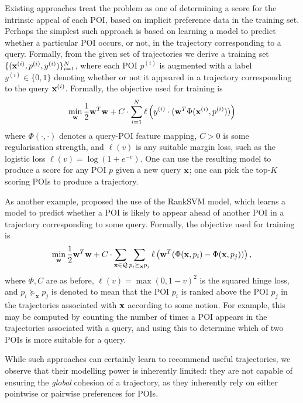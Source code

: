 
Existing approaches treat the problem as one of determining a score for the intrinsic appeal of each POI,
based on implicit preference data in the training set.
Perhaps the simplest such approach is based on learning a model to predict whether a particular POI occurs, or not, in the trajectory corresponding to a query.
Formally, from the given set of trajectories
we derive a training set $\{ ( \mathbf{x}^{(i)}, p^{(i)}, y^{(i)} ) \}_{i = 1}^N$,
where each POI $p^{(i)}$ is augmented with a label $y^{(i)} \in \{ 0, 1 \}$ denoting whether or not it appeared in a trajectory corresponding to the query $\mathbf{x}^{(i)}$. 
Formally, the objective used for training is
$$ \min_{\mathbf{w}} \frac{1}{2} \mathbf{w}^T \mathbf{w} + C \cdot \sum_{i = 1}^N \ell\left( y^{(i)} \cdot ( \mathbf{w}^T \Phi( \mathbf{x}^{(i)}, p^{(i)} ) ) \right) $$
where
$\Phi( \cdot, \cdot )$ denotes a query-POI feature mapping,
$C > 0$ is some regularisation strength,
and $\ell( v )$ is any suitable margin loss, such as the logistic loss $\ell( v ) = \log( 1 + e^{-v} )$.
One can use the resulting model to produce a score for any POI $p$ given a new query $\mathbf{x}$;
one can pick the top-$K$ scoring POIs to produce a trajectory.

As another example, \citet{cikm16paper} proposed the use of the RankSVM model,
which %
learns a model to predict whether a POI is likely to appear ahead of another POI in a trajectory corresponding to some query.
Formally, the objective used for training is
$$ \min_{\mathbf{w}} \frac{1}{2} \mathbf{w}^T \mathbf{w} + C \cdot \sum_{\mathbf{x} \in \mathcal{Q}} \sum_{p_i \succeq_{\mathbf{x}} p_j} \ell\left( \mathbf{w}^T ( \Phi( \mathbf{x}, p_i ) - \Phi( \mathbf{x}, p_j ) ) \right), $$
where $\Phi, C$ are as before,
$\ell( v ) = \max( 0, 1 - v )^2$ is the squared hinge loss,
and
$p_i \succeq_{\mathbf{x}} p_j$ is denoted to mean that the POI $p_i$ is ranked above the POI $p_j$ in the trajectories associated with $\mathbf{x}$ according to some notion.
For example, this may be computed \eg by counting the number of times a POI appears in the trajectories associated with a query, and using this to determine which of two POIs is more suitable for a query.

While such approaches can certainly learn to recommend useful trajectories,
we observe that their modelling power is inherently limited:
they are not capable of ensuring the \emph{global} cohesion of a trajectory,
as they inherently rely on either pointwise or pairwise preferences for POIs.

